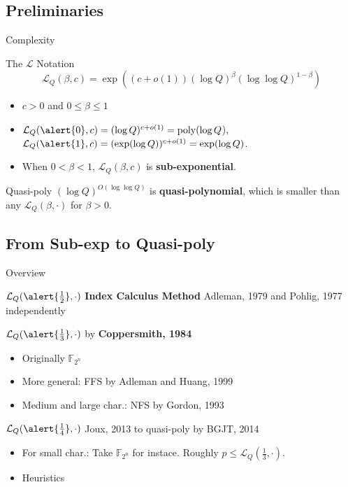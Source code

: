\documentclass{beamer}
\begin{document}
	\subsection{Preliminaries}
		\begin{frame}{Complexity}
			\begin{block}{The $\mathcal{L}$ Notation}
				$$\mathcal{L}_Q(\beta, c) = \exp((c + o(1))(\log Q)^\beta (\log\log Q)^{1-\beta})$$
				\begin{itemize}
					\item 
						$c>0$ and $0 \le \beta \le 1$
					\item
						$\mathcal{L}_Q(\alert{0}, c) = (\log Q)^{c + o(1)} = \text{poly}(\log Q$),\\
						$\mathcal{L}_Q(\alert{1}, c) = (\exp(\log Q))^{c+o(1)} = \text{exp}(\log Q)$. 
					\item
						When $0<\beta<1$, $\mathcal{L}_Q(\beta, c)$ is \textbf{sub-exponential}.
				\end{itemize}
			\end{block}
			\begin{block}{Quasi-poly}
				$(\log Q)^{O(\log\log Q)}$ is \textbf{quasi-polynomial}, 
				which is smaller than any $\mathcal{L}_Q(\beta, \cdot)$ for $\beta >0$.
			\end{block}
		\end{frame}
	\subsection{From Sub-exp to Quasi-poly}		
		\begin{frame}{Overview}
			\begin{block}{$\mathcal{L}_Q(\alert{\frac{1}{2}}, \cdot)$ \textbf{Index Calculus Method}}
				Adleman, 1979 and Pohlig, 1977 independently
			\end{block}
			\begin{block}{$\mathcal{L}_Q(\alert{\frac{1}{3}}, \cdot)$ by \textbf{Coppersmith, 1984}}
				\begin{itemize}
						\item
							Originally $\mathbb{F}_{2^n}$
						\item
							More general: FFS by Adleman and Huang, 1999
						\item
							Medium and large char.: NFS by Gordon, 1993
				\end{itemize}
			\end{block}
			\begin{block}{$\mathcal{L}_Q(\alert{\frac{1}{4}}, \cdot)$ Joux, 2013 to \alert{quasi-poly} by BGJT, 2014}
				\begin{itemize}
					\item 
						For small char.: Take $\mathbb{F}_{2^n}$ for instace. Roughly $p \leq \mathcal{L}_Q(\frac{1}{3}, \cdot)$.
					\item
						Heuristics
				\end{itemize}
			\end{block}
		\end{frame}
\end{document}
